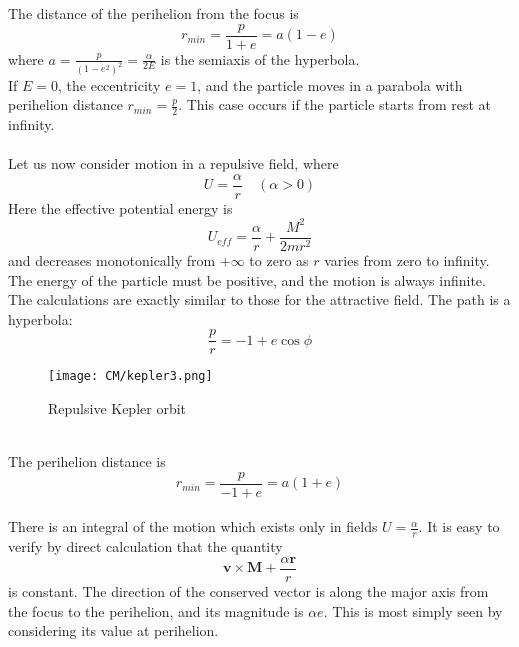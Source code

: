 \documentclass[cyan]{elegantnote}
\begin{document}
The distance of the perihelion from the focus is
\[r_{min} = \frac{p}{1+e} = a(1-e)\]
where $a = \frac{p}{(1-e^2)^2} = \frac{\alpha}{2E}$ is the semiaxis of the hyperbola.\\
If $E = 0$, the eccentricity $e = 1$, and the particle moves in a parabola with perihelion distance $r_{min} = \frac{p}{2}$. This case occurs if the particle starts from rest
at infinity.\\ \\
Let us now consider motion in a repulsive field, where
\[U= \frac{\alpha}{r} \quad (\alpha > 0)\]
Here the effective potential energy is
\[U_{eff} = \frac{\alpha}{r} + \frac{M^2}{2mr^2}\]
and decreases monotonically from $+\infty$ to zero as $r$ varies from zero to infinity. 
The energy of the particle must be positive, and the motion is always infinite. The calculations are exactly similar to those for the attractive field.
The path is a hyperbola:
\[\frac{p}{r} = -1 + e\cos\phi\]
\begin{figure}[!h]
	\centering
	\texttt{[image: CM/kepler3.png]}
	\caption{Repulsive Kepler orbit}
\end{figure}\\
The perihelion distance is
\[r_{min} = \frac{p}{-1+e} = a(1+e)\]\\
There is an integral of the motion which exists only in fields $U = \frac{\alpha}{r}$. It is easy to verify by direct calculation that the quantity
\[\bm{v}\times\bm{M} + \frac{\alpha \bm{r}}{r}\]
is constant. The direction of the conserved vector is along the major axis from the focus to the perihelion, and its magnitude is $\alpha e$. This is most simply seen by considering its value at perihelion.
\end{document}
